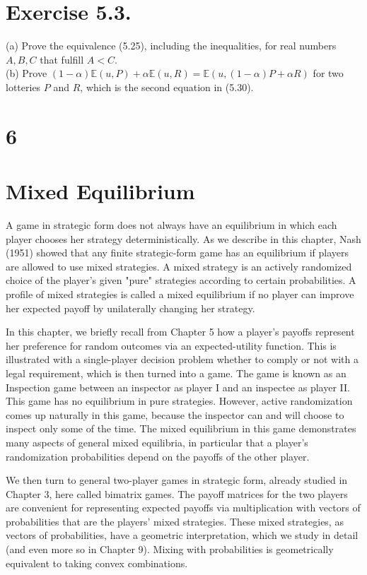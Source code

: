 \documentclass[12pt]{article}
\begin{document}
\section*{Exercise 5.3.}
(a) Prove the equivalence (5.25), including the inequalities, for real numbers $A, B, C$ that fulfill $A<C$.\\
(b) Prove $(1-\alpha) \mathbb{E}(u, P)+\alpha \mathbb{E}(u, R)=\mathbb{E}(u,(1-\alpha) P+\alpha R)$ for two lotteries $P$ and $R$, which is the second equation in (5.30).

\section*{6}
\section*{Mixed Equilibrium}
A game in strategic form does not always have an equilibrium in which each player chooses her strategy deterministically. As we describe in this chapter, Nash (1951) showed that any finite strategic-form game has an equilibrium if players are allowed to use mixed strategies. A mixed strategy is an actively randomized choice of the player's given "pure" strategies according to certain probabilities. A profile of mixed strategies is called a mixed equilibrium if no player can improve her expected payoff by unilaterally changing her strategy.

In this chapter, we briefly recall from Chapter 5 how a player's payoffs represent her preference for random outcomes via an expected-utility function. This is illustrated with a single-player decision problem whether to comply or not with a legal requirement, which is then turned into a game. The game is known as an Inspection game between an inspector as player I and an inspectee as player II. This game has no equilibrium in pure strategies. However, active randomization comes up naturally in this game, because the inspector can and will choose to inspect only some of the time. The mixed equilibrium in this game demonstrates many aspects of general mixed equilibria, in particular that a player's randomization probabilities depend on the payoffs of the other player.

We then turn to general two-player games in strategic form, already studied in Chapter 3, here called bimatrix games. The payoff matrices for the two players are convenient for representing expected payoffs via multiplication with vectors of probabilities that are the players' mixed strategies. These mixed strategies, as vectors of probabilities, have a geometric interpretation, which we study in detail (and even more so in Chapter 9). Mixing with probabilities is geometrically equivalent to taking convex combinations.
\end{document}
